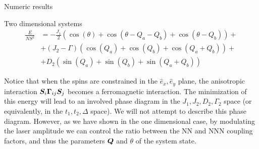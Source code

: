 \begin{section}{Numeric results}
\begin{subsection}{Two dimensional systems}
\begin{align}
\frac{E}{NS^2} &= -\frac{J_1}{2}\left( \cos(\theta) + \cos(\theta - Q_a - Q_b) + \cos(\theta - Q_b) \right) + \nonumber \\
&+ (J_2-\Gamma) \left( \cos(Q_a) + \cos(Q_b) + \cos(Q_a+Q_b) \right)+ \nonumber \\
&+D_2\left( \sin(Q_a) + \sin(Q_b) + \sin(Q_a+Q_b) \right)
\end{align}

Notice that when the spins are constrained in the $\hat{e}_x, \hat{e}_y$ plane, the anisotropic interaction $\boldsymbol{S}_i\boldsymbol{\Gamma}_{ij}\boldsymbol{S}_j$ becomes a ferromagnetic interaction. The minimization of this energy will lead to an involved phase diagram in the $J_1, J_2, D_2, \Gamma_2$ space (or equivalently, in the $t_1, t_2, \Delta$ space). We will not attempt to describe this phase diagram. However, as we have shown in the one dimensional case, by modulating the laser amplitude we can control the ratio between the NN and NNN coupling factors, and thus the parameters $\boldsymbol{Q}$ and $\theta$ of the system state.

\end{subsection}

\end{section}
